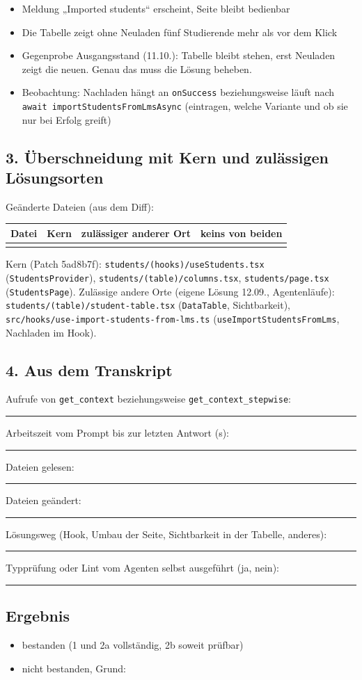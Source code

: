 \begin{itemize}[nosep,leftmargin=2.4em]
\item[\kreuz] Meldung „Imported students“ erscheint, Seite bleibt bedienbar
\item[\kreuz] Die Tabelle zeigt ohne Neuladen fünf Studierende mehr als vor dem Klick
\item[--] Gegenprobe Ausgangsstand (11.10.): Tabelle bleibt stehen, erst Neuladen zeigt die neuen. Genau das muss die Lösung beheben.
\item[--] Beobachtung: Nachladen hängt an \texttt{onSuccess} beziehungsweise läuft nach \texttt{await importStudentsFromLmsAsync} (eintragen, welche Variante und ob sie nur bei Erfolg greift)
\end{itemize}
\subsection*{3. Überschneidung mit Kern und zulässigen Lösungsorten}

Geänderte Dateien (aus dem Diff):

\begin{tabularx}{\linewidth}{Xlll}
\toprule
Datei & Kern & zulässiger anderer Ort & keins von beiden \\
\midrule
&&& \\
\bottomrule
\end{tabularx}

Kern (Patch 5ad8b7f): \texttt{students/\allowbreak{}(hooks)/\allowbreak{}useStudents.tsx} (\texttt{StudentsProvider}), \texttt{students/\allowbreak{}(table)/\allowbreak{}columns.tsx}, \texttt{students/\allowbreak{}page.tsx} (\texttt{StudentsPage}). Zulässige andere Orte (eigene Lösung 12.09., Agentenläufe): \texttt{students/\allowbreak{}(table)/\allowbreak{}student-\allowbreak{}table.tsx} (\texttt{DataTable}, Sichtbarkeit), \texttt{src/\allowbreak{}hooks/\allowbreak{}use-\allowbreak{}import-\allowbreak{}students-\allowbreak{}from-\allowbreak{}lms.ts} (\texttt{useImportStudentsFromLms}, Nachladen im Hook).

\subsection*{4. Aus dem Transkript}

\noindent Aufrufe von \texttt{get\_context} beziehungsweise \texttt{get\_context\_stepwise}:~\rule{2.5em}{0.4pt}\par
\noindent Arbeitszeit vom Prompt bis zur letzten Antwort (s):~\rule{2.5em}{0.4pt}\par
\noindent Dateien gelesen:~\rule{2.5em}{0.4pt}\par
\noindent Dateien geändert:~\rule{2.5em}{0.4pt}\par
\noindent Lösungsweg (Hook, Umbau der Seite, Sichtbarkeit in der Tabelle, anderes):~\rule{2.5em}{0.4pt}\par
\noindent Typprüfung oder Lint vom Agenten selbst ausgeführt (ja, nein):~\rule{2.5em}{0.4pt}\par
\subsection*{Ergebnis}

\begin{itemize}[nosep,leftmargin=2.4em]
\item[\kreuz] bestanden (1 und 2a vollständig, 2b soweit prüfbar)
\item[\kreuz] nicht bestanden, Grund:
\end{itemize}
